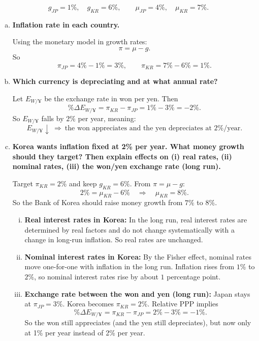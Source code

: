 \documentclass[11pt]{article}
\newenvironment{problem}[2][Problem]{\begin{trivlist}
\item[\hskip \labelsep {\bfseries #1}\hskip \labelsep {\bfseries #2.}]
\leavevmode\par
}{\end{trivlist}}
\begin{document}
\begin{problem}{2}

\[
g_{JP}=1\%, \quad g_{KR}=6\%, \qquad
\mu_{JP}=4\%, \quad \mu_{KR}=7\%.
\]

\begin{enumerate}[(a)]
\item \textbf{Inflation rate in each country.}

Using the monetary model in growth rates:
\[
\pi = \mu - g.
\]
So
\[
\pi_{JP} = 4\% - 1\% = 3\%,
\qquad
\pi_{KR} = 7\% - 6\% = 1\%.
\]

\item \textbf{Which currency is depreciating and at what annual rate?}

Let $E_{W/\yen}$ be the exchange rate in won per yen. Then
\[
\%\Delta E_{W/\yen} = \pi_{KR} - \pi_{JP} = 1\% - 3\% = -2\%.
\]
So $E_{W/\yen}$ falls by $2\%$ per year, meaning:
\[
E_{W/\yen}\downarrow \ \Rightarrow\ \text{the won appreciates and the yen depreciates at } 2\%\text{/year.}
\]

\item \textbf{Korea wants inflation fixed at 2\% per year. What money growth should they target?
Then explain effects on (i) real rates, (ii) nominal rates, (iii) the won/yen exchange rate (long run).}

Target $\pi_{KR}=2\%$ and keep $g_{KR}=6\%$. From $\pi=\mu-g$:
\[
2\% = \mu_{KR} - 6\%
\quad\Longrightarrow\quad
\mu_{KR} = 8\%.
\]
So the Bank of Korea should raise money growth from $7\%$ to $8\%$.

\begin{enumerate}[(i)]
\item \textbf{Real interest rates in Korea:} In the long run, real interest rates are determined by real factors and do not change systematically with a change in long-run inflation. So real rates are unchanged.

\item \textbf{Nominal interest rates in Korea:} By the Fisher effect, nominal rates move one-for-one with inflation in the long run. Inflation rises from $1\%$ to $2\%$, so nominal interest rates rise by about $1$ percentage point.

\item \textbf{Exchange rate between the won and yen (long run):}
Japan stays at $\pi_{JP}=3\%$. Korea becomes $\pi_{KR}=2\%$. Relative PPP implies
\[
\%\Delta E_{W/\yen} = \pi_{KR} - \pi_{JP} = 2\% - 3\% = -1\%.
\]
So the won still appreciates (and the yen still depreciates), but now only at 1\% per year instead of 2\% per year.
\end{enumerate}

\end{enumerate}
\end{problem}
\end{document}
